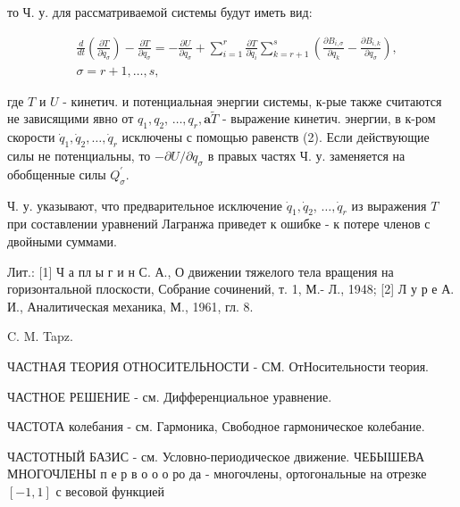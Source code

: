 \documentclass[10pt]{article}
\begin{document}
то Ч. у. для рассматриваемой системы будут иметь вид:



\[

\begin{aligned}

& \frac{d}{d t}\left(\frac{\partial T}{\partial \dot{q}_{\sigma}}\right)-\frac{\partial T}{\partial q_{\sigma}}=-\frac{\partial U}{\partial q_{\sigma}}+\sum_{i=1}^{r} \frac{\partial T}{\partial \dot{q}_{i}} \sum_{k=r+1}^{s}\left(\frac{\partial B_{i, \sigma}}{\partial q_{k}}-\frac{\partial B_{i, k}}{\partial q_{\sigma}}\right), \\

& \sigma=r+1, \ldots, s,

\end{aligned}

\]



где $T$ и $U$ - кинетич. и потенциальная энергии системы, к-рые также считаются не зависящими явно от $q_{1}, q_{2}$, $\ldots, q_{r}, \mathbf{a} \widetilde{T}$ - выражение кинетич. энергии, в к-ром скорости $\dot{q}_{1}, \dot{q}_{2}, \ldots, \dot{q}_{r}$ исключены с помощью равенств (2). Если действующие силы не потенциальны, то $-\partial U / \partial q_{\sigma}$ в правых частях Ч. у. заменяется на обобщенные силы $Q_{\sigma}^{\prime}$.



Ч. у. указывают, что предварительное исключение $\dot{q}_{1}, \dot{q}_{2}$, $\ldots, \dot{q}_{r}$ из выражения $T$ при составлении уравнений Лагранжа приведет к ошибке - к потере членов с двойными суммами.



Лит.: [1] Ч а пл ы г и н С. А., О движении тяжелого тела вращения на горизонтальной плоскости, Собрание сочинений, т. 1, М.- Л., 1948; [2] Л у р е А. И., Аналитическая механика, М., 1961, гл. 8.



C. M. Tapz.



ЧАСТНАЯ ТЕОРИЯ ОТНОСИТЕЛЬНОСТИ - СМ. ОтНосительности теория.



ЧАСТНОЕ РЕШЕНИЕ - см. Дифференциальное уравнение.



ЧАСТОТА колебания - см. Гармоника, Свободное гармоническое колебание.



ЧАСТОТНЫЙ БАЗИС - см. Условно-периодическое движение. ЧЕБЫШЕВА МНОГОЧЛЕНЫ п е р в о о о ро да - многочлены, ортогональные на отрезке $[-1,1]$ с весовой функцией
\end{document}
